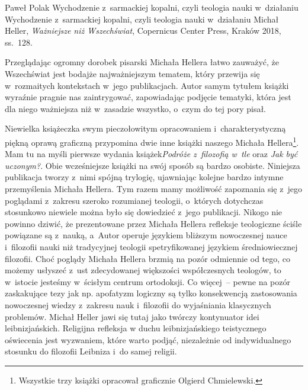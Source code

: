 \begin{recplenv}{Paweł Polak}
	{Wychodzenie z~sarmackiej kopalni, czyli teologia nauki w~działaniu}
	{Wychodzenie z~sarmackiej kopalni, czyli teologia nauki w~działaniu}
	{Michał Heller, \textit{Ważniejsze niż Wszechświat}, Copernicus Center Press, Kraków 2018,
		ss.~128.}




Przeglądając ogromny dorobek pisarski Michała Hellera łatwo zauważyć, że Wszechświat jest bodajże najważniejszym
tematem, który przewija się w~rozmaitych kontekstach w~jego publikacjach. Autor samym tytułem książki wyraźnie pragnie
nas zaintrygować, zapowiadając podjęcie tematyki, która jest dla niego ważniejsza niż w~zasadzie wszystko, o~czym do
tej pory pisał.

Niewielka książeczka swym pieczołowitym opracowaniem i~charakterystyczną piękną oprawą graficzną przypomina dwie
inne książki naszego Michała Hellera\footnote{Wszystkie trzy książki opracował graficznie Olgierd Chmielewski.}. Mam tu
na myśli pierwsze wydania książek\textit{Podróże z~filozofią w~tle }oraz
\textit{Jak być uczonym?}. Obie wcześniejsze książki na swój sposób są bardzo
osobiste. Niniejsza publikacja tworzy z~nimi spójną trylogię, ujawniając kolejne bardzo intymne przemyślenia Michała
Hellera. Tym razem mamy możliwość zapoznania się z~jego poglądami z~zakresu szeroko rozumianej teologii, o~których
dotychczas stosunkowo niewiele można było się dowiedzieć z~jego publikacji. Nikogo nie powinno dziwić, że prezentowane
przez Michała Hellera refleksje teologiczne ściśle powiązane są z~nauką, a~Autor operuje językiem bliższym nowoczesnej
nauce i~filozofii nauki niż tradycyjnej teologii spetryfikowanej językiem średniowiecznej filozofii. Choć poglądy
Michała Hellera brzmią na pozór odmiennie od tego, co możemy usłyszeć z~ust zdecydowanej większości współczesnych
teologów, to w~istocie jesteśmy w~ścisłym centrum ortodoksji. Co więcej~-- pewne na pozór zaskakujące tezy jak np.
apofatyzm logiczny są tylko konsekwencją zastosowania nowoczesnej wiedzy z~zakresu nauk i~filozofii do wyjaśniania
klasycznych problemów. Michał Heller jawi się tutaj jako twórczy kontynuator idei leibnizjańskich. Religijna refleksja
w duchu leibnizjańskiego teistycznego oświecenia jest wyzwaniem, które warto podjąć, niezależnie od indywidualnego
stosunku do filozofii Leibniza i~do samej religii.


\end{recplenv}
